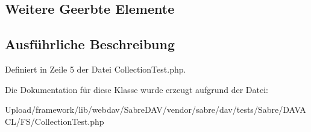 \subsection*{Weitere Geerbte Elemente}


\subsection{Ausführliche Beschreibung}


Definiert in Zeile 5 der Datei Collection\+Test.\+php.



Die Dokumentation für diese Klasse wurde erzeugt aufgrund der Datei\+:\begin{DoxyCompactItemize}
\item 
Upload/framework/lib/webdav/\+Sabre\+D\+A\+V/vendor/sabre/dav/tests/\+Sabre/\+D\+A\+V\+A\+C\+L/\+F\+S/Collection\+Test.\+php\end{DoxyCompactItemize}
